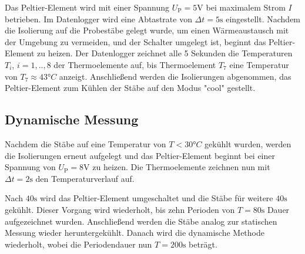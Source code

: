 Das Peltier-Element wird mit einer Spannung $U_\mathup{P}=5 \si{\volt}$ bei maximalem Strom $I$ betrieben. 
Im Datenlogger wird eine Abtastrate von $\Delta{t}=5\si{\second}$ eingestellt. 
Nachdem die Isolierung auf die Probestäbe gelegt wurde, um einen Wärmeaustausch mit der Umgebung zu vermeiden, und der Schalter umgelegt ist, beginnt das Peltier-Element zu heizen. 
Der Datenlogger zeichnet alle 5 Sekunden die Temperaturen $T_i$, $i=1,..,8$ der Thermoelemente auf, bis Thermoelement $T_7$ eine Temperatur von $T_\mathup{7}\approx 43°C$ anzeigt. 
Anschließend werden die Isolierungen abgenommen, das Peltier-Element zum Kühlen der Stäbe auf den Modus "cool" gestellt.

\subsection{Dynamische Messung}
Nachdem die Stäbe auf eine Temperatur von $T<30°C$ gekühlt wurden, werden die Isolierungen erneut aufgelegt und das Peltier-Element beginnt bei einer Spannung von $U_\mathup{P}=8 \si{\volt}$ zu heizen. Die Thermoelemente zeichnen nun mit $\Delta{t}=2\si{\second}$ den Temperaturverlauf auf.

Nach $40\si\second$ wird das Peltier-Element umgeschaltet und die Stäbe für weitere $40\si\second$ gekühlt. 
Dieser Vorgang wird wiederholt, bis zehn Perioden von $T=80\si\second$ Dauer aufgezeichnet wurden. 
Anschließend werden die Stäbe analog zur statischen Messung wieder heruntergekühlt. 
Danach wird die dynamische Methode wiederholt, wobei die Periodendauer nun $T=200\si\second$ beträgt. 
